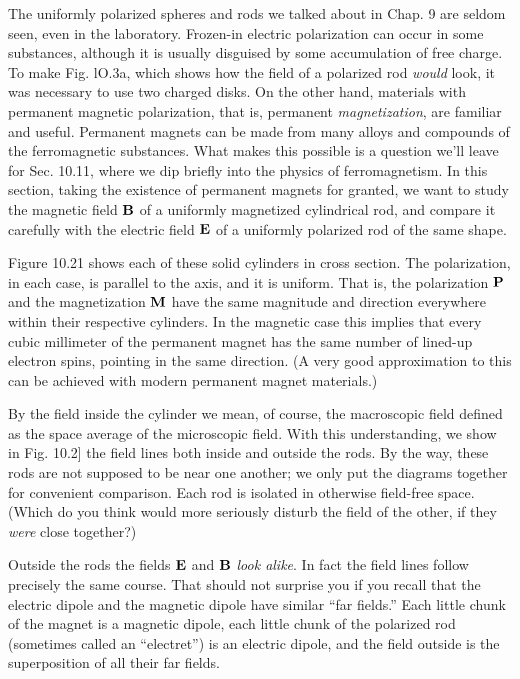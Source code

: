 The uniformly polarized spheres and rods we talked about in
Chap. 9 are seldom seen, even in the laboratory. Frozen-in electric
polarization can occur in some substances, although it is usually
disguised by some accumulation of free charge. To make Fig. lO.3a,
which shows how the field of a polarized rod \emph{would} look, it was necessary
to use two charged disks. On the other hand, materials with
permanent magnetic polarization, that is, permanent \emph{magnetization},
are familiar and useful. Permanent magnets can be made from many
alloys and compounds of the ferromagnetic substances. What
makes this possible is a question we'll leave for Sec. 10.11, where we
dip briefly into the physics of ferromagnetism. In this section, taking
the existence of permanent magnets for granted, we want to study
the magnetic field $\mathbf{B}$ of a uniformly magnetized cylindrical rod, and
compare it carefully with the electric field $\mathbf{E}$ of a uniformly polarized
rod of the same shape.

Figure 10.21 shows each of these solid cylinders in cross section.
The polarization, in each case, is parallel to the axis, and it is 
uniform. That is, the polarization $\mathbf{P}$ and the magnetization $\mathbf{M}$ have the
same magnitude and direction everywhere within their respective
cylinders. In the magnetic case this implies that every cubic millimeter
of the permanent magnet has the same number of lined-up
electron spins, pointing in the same direction. (A very good approximation
to this can be achieved with modern permanent magnet
materials.)

By the field inside the cylinder we mean, of course, the macroscopic
field defined as the space average of the microscopic field.
With this understanding, we show in Fig. 10.2] the field lines both
inside and outside the rods. By the way, these rods are not supposed
to be near one another; we only put the diagrams together for convenient
comparison. Each rod is isolated in otherwise field-free
space. (Which do you think would more seriously disturb the field
of the other, if they \emph{were} close together?)

Outside the rods the fields $\mathbf{E}$ and $\mathbf{B}$ \emph{look alike}. In fact the field
lines follow precisely the same course. That should not surprise
you if you recall that the electric dipole and the magnetic dipole have
similar ``far fields.'' Each little chunk of the magnet is a magnetic
dipole, each little chunk of the polarized rod (sometimes called an
``electret'') is an electric dipole, and the field outside is the superposition
of all their far fields.

